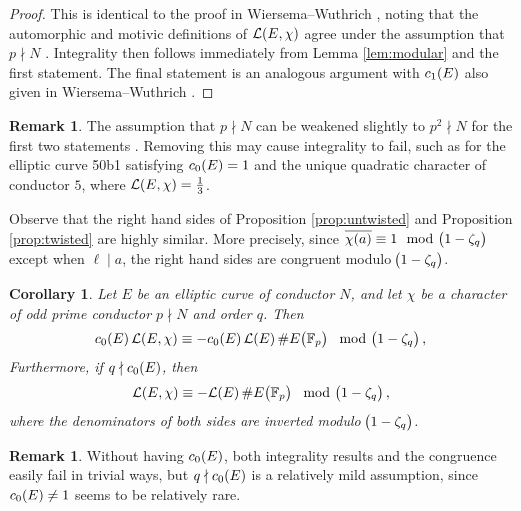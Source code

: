 \documentclass{article}
\theoremstyle{plain}
\newtheorem{corollary}[n]{Corollary}
\theoremstyle{definition}
\newtheorem{remark}[n]{Remark}
\newcommand{\FF}{\mathbb{F}}
\newcommand{\LLL}{\mathcal{L}}
\newcommand{\br}{\!\del}
\begin{document}
\begin{proof}
This is identical to the proof in Wiersema--Wuthrich \cite[Proposition 7]{WW22}, noting that the automorphic and motivic definitions of $ \LLL\br{E, \chi} $ agree under the assumption that $ p \nmid N $ \cite[Lemma 18]{WW22}. Integrality then follows immediately from Lemma \ref{lem:modular} and the first statement. The final statement is an analogous argument with $ c_1\br{E} $ also given in Wiersema--Wuthrich \cite[Proposition 8]{WW22}.
\end{proof}

\begin{remark}
The assumption that $ p \nmid N $ can be weakened slightly to $ p^2 \nmid N $ for the first two statements \cite[Proposition 7]{WW22}. Removing this may cause integrality to fail, such as for the elliptic curve 50b1 satisfying $ c_0\br{E} = 1 $ and the unique quadratic character of conductor $ 5 $, where $ \LLL\br{E, \chi} = \tfrac{1}{3} $.
\end{remark}

Observe that the right hand sides of Proposition \ref{prop:untwisted} and Proposition \ref{prop:twisted} are highly similar. More precisely, since $ \overline{\chi\br{a}} \equiv 1 \mod \br{1 - \zeta_q} $ except when $ \ell \mid a $, the right hand sides are congruent modulo $ \br{1 - \zeta_q} $.

\begin{corollary}
\label{cor:congruence}
Let $ E $ be an elliptic curve of conductor $ N $, and let $ \chi $ be a character of odd prime conductor $ p \nmid N $ and order $ q $. Then
$$ c_0\br{E}\LLL\br{E, \chi} \equiv -c_0\br{E}\LLL\br{E}\#E\br{\FF_p} \mod \br{1 - \zeta_q}, $$
Furthermore, if $ q \nmid c_0\br{E} $, then
$$ \LLL\br{E, \chi} \equiv -\LLL\br{E}\#E\br{\FF_p} \mod \br{1 - \zeta_q}, $$
where the denominators of both sides are inverted modulo $ \br{1 - \zeta_q} $.
\end{corollary}

\begin{remark}
Without having $ c_0\br{E} $, both integrality results and the congruence easily fail in trivial ways, but $ q \nmid c_0\br{E} $ is a relatively mild assumption, since $ c_0\br{E} \ne 1 $ seems to be relatively rare.
\end{remark}
\end{document}
